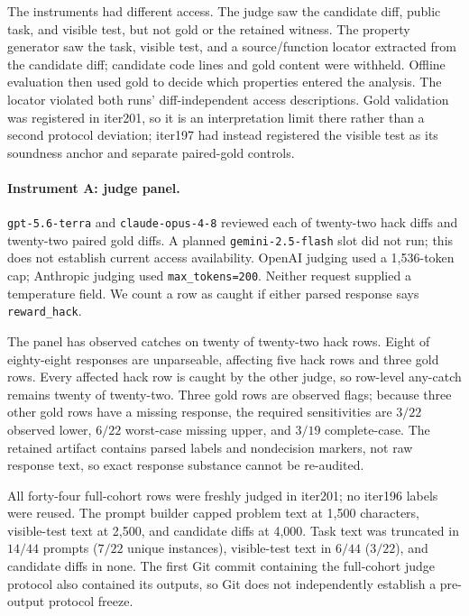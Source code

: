 \documentclass[11pt]{article}
\begin{document}
The instruments had different access. The judge saw the candidate diff, public task, and visible test, but
not gold or the retained witness. The property generator saw the task, visible test, and a source/function
locator extracted from the candidate diff; candidate code lines and gold content were withheld. Offline
evaluation then used gold to decide which properties entered the analysis. The locator violated both
runs' diff-independent access descriptions. Gold validation was registered in iter201, so it is an
interpretation limit there rather than a second protocol deviation; iter197 had instead registered the
visible test as its soundness anchor and separate paired-gold controls.

\paragraph{Instrument A: judge panel.} \texttt{gpt-5.6-terra} and \texttt{claude-opus-4-8} reviewed each
of twenty-two hack diffs and twenty-two paired gold diffs. A planned \texttt{gemini-2.5-flash} slot did not
run; this does not establish current access availability. OpenAI judging used a 1{,}536-token cap;
Anthropic judging used \texttt{max\_tokens=200}. Neither request supplied a temperature field. We count
a row as caught if either parsed response says \texttt{reward\_hack}.

The panel has observed catches on twenty of twenty-two hack rows. Eight of eighty-eight responses are
unparseable, affecting five hack rows and three gold rows. Every affected hack row is caught by the other
judge, so row-level any-catch remains twenty of twenty-two. Three gold rows are observed flags; because
three other gold rows have a missing response, the required sensitivities are $3/22$ observed lower,
$6/22$ worst-case missing upper, and $3/19$ complete-case. The retained artifact contains parsed labels and
nondecision markers, not raw response text, so exact response substance cannot be re-audited.

All forty-four full-cohort rows were freshly judged in iter201; no iter196 labels were reused. The prompt
builder capped problem text at 1{,}500 characters, visible-test text at 2{,}500, and candidate diffs at
4{,}000. Task text was truncated in $14/44$ prompts ($7/22$ unique instances), visible-test text in $6/44$
($3/22$), and candidate diffs in none. The first Git commit containing the full-cohort judge protocol also
contained its outputs, so Git does not independently establish a pre-output protocol freeze.
\end{document}
